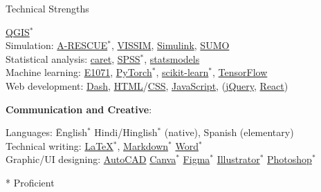 \documentclass{CV} %
\begin{document}
\begin{rSection}{Technical Strengths}
\begin{spacing}{1.25}
\begin{tabbing}
            \href{https://en.wikipedia.org/wiki/QGIS}{QGIS}$^*$
        \\ Simulation: \>
            \href{https://umnilab.github.io/HSEES_doc/}{A-RESCUE}$^*$,
            \href{https://en.wikipedia.org/wiki/PTV_Vissim}{VISSIM},
            \href{https://en.wikipedia.org/wiki/Simulink}{Simulink},
            \href{https://en.wikipedia.org/wiki/Simulation_of_Urban_MObility}{SUMO}
        \\ Statistical analysis: \>
            \href{https://topepo.github.io/caret/}{caret},
            \href{https://www.ibm.com/products/spss-statistics}{SPSS}$^*$,
            \href{https://www.statsmodels.org/stable/index.html}{statsmodels}
        \\ Machine learning: \>
            \href{https://cran.r-project.org/web/packages/e1071/index.html}{E1071},
            \href{https://en.wikipedia.org/wiki/PyTorch}{PyTorch}$^*$,
            \href{https://en.wikipedia.org/wiki/Scikit-learn}{scikit-learn}$^*$,
            \href{https://en.wikipedia.org/wiki/TensorFlow}{TensorFlow}
        \\ Web development: \>
            \href{https://dash.plotly.com/}{Dash},
            \href{https://en.wikipedia.org/wiki/HTML}{HTML}/\href{https://en.wikipedia.org/wiki/CSS}{CSS},
            \href{https://en.wikipedia.org/wiki/JavaScript}{JavaScript},
            (\href{https://en.wikipedia.org/wiki/JQuery}{jQuery},
            \href{https://en.wikipedia.org/wiki/React_(JavaScript_library)}{React})
    \end{tabbing}
    \end{spacing}
    \textbf{Communication and Creative}:
    \begin{spacing}{1.25}
    \begin{tabbing}
        Languages: \hspace*{2.66cm} \=
            English$^*$
            Hindi/Hinglish$^*$ (native),
            Spanish (elementary)
        \\ Technical writing: \>
            \href{https://en.wikipedia.org/wiki/LaTeX}{LaTeX}$^*$,
            \href{https://en.wikipedia.org/wiki/Markdown}{Markdown}$^*$
            \href{https://en.wikipedia.org/wiki/Microsoft_Word}{Word}$^*$
        \\ Graphic/UI designing: \>
            \href{https://en.wikipedia.org/wiki/AutoCAD}{AutoCAD}
            \href{https://en.wikipedia.org/wiki/Canva}{Canva}$^*$
            \href{https://en.wikipedia.org/wiki/Figma}{Figma}$^*$
            \href{https://en.wikipedia.org/wiki/Adobe_Illustrator}{Illustrator}$^*$
            \href{https://en.wikipedia.org/wiki/Adobe_Photoshop}{Photoshop}$^*$
    \end{tabbing}
    \end{spacing}
    * Proficient
\end{rSection}
\end{document}
